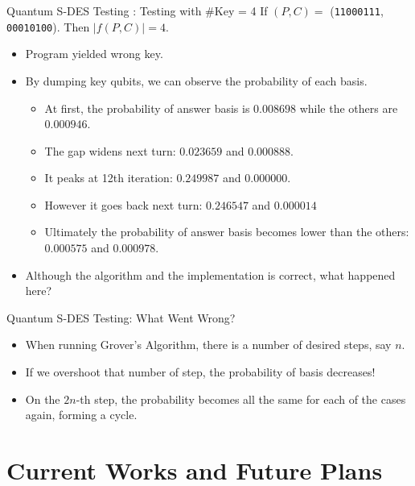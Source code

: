 \documentclass{beamer}
\begin{document}
       
   	\begin{frame}{Quantum S-DES Testing : Testing with \#Key = 4}
        If $ (P, C) =$ (\texttt{11000111}, \texttt{00010100}). Then $ \vert f(P, C) \vert = 4$.
        \begin{itemize}
            \item Program yielded wrong key.
            \item By dumping key qubits, we can observe the probability of each basis.
            \begin{itemize}
                \item At first, the probability of answer basis is $ 0.008698 $ while the others are $ 0.000946 $.
                \item The gap widens next turn: $ 0.023659 $ and $ 0.000888 $.
                \item It peaks at 12th iteration: $ 0.249987 $ and $ 0.000000 $.
                \item However it goes back next turn: $ 0.246547 $ and $ 0.000014 $
                \item Ultimately the probability of answer basis becomes lower than the others: $ 0.000575 $ and $ 0.000978 $.
            \end{itemize}
            \item Although the algorithm and the implementation is correct, what happened here? %
        \end{itemize}
   	\end{frame}
   	
   	\begin{frame}{Quantum S-DES Testing: What Went Wrong?}
   		\begin{itemize}
   			\item When running Grover's Algorithm, there is a number of desired steps, say $n$.
   			\item If we overshoot that number of step, the probability of basis decreases!
   			\item On the $2n$-th step, the probability becomes all the same for each of the cases again, forming a cycle.
   		\end{itemize}
   	\end{frame}
     
    
	\section{Current Works and Future Plans}
	
\end{document}
